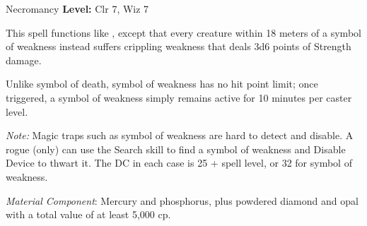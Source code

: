 {Necromancy}
{
	\textbf{Level:}
	Clr 7, Wiz 7\\
}
{
	This spell functions like , except that every creature within 18 meters of a symbol of weakness instead suffers crippling weakness that deals 3d6 points of Strength damage.

	Unlike symbol of death, symbol of weakness has no hit point limit; once triggered, a symbol of weakness simply remains active for 10 minutes per caster level.

	\textit{Note:} Magic traps such as symbol of weakness are hard to detect and disable. A rogue (only) can use the Search skill to find a symbol of weakness and Disable Device to thwart it. The DC in each case is 25 + spell level, or 32 for symbol of weakness.

	\textit{Material Component}:
	Mercury and phosphorus, plus powdered diamond and opal with a total value of at least 5,000 cp.

}
